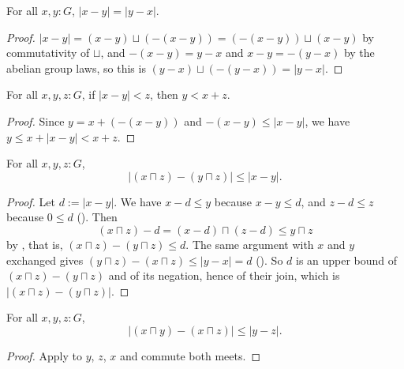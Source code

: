 \begin{lemma}
  \label{absSubComm}
  For all $x, y : G$, $\lvert x - y \rvert = \lvert y - x \rvert$.
\end{lemma}
\begin{proof}
  $\lvert x - y \rvert = (x - y) \sqcup (-(x - y)) = (-(x - y)) \sqcup (x - y)$ by commutativity of $\sqcup$, and $-(x - y) = y - x$ and $x - y = -(y - x)$ by the abelian group laws, so this is $(y - x) \sqcup (-(y - x)) = \lvert y - x \rvert$.
\end{proof}

\begin{lemma}
  \label{absDeltaLtLtPlus}
  For all $x, y, z : G$, if $\lvert x - y \rvert < z$, then $y < x + z$.
\end{lemma}
\begin{proof}
  Since $y = x + (-(x - y))$ and $-(x - y) \le \lvert x - y \rvert$, we have $y \le x + \lvert x - y \rvert < x + z$.
\end{proof}

\begin{lemma}
  \label{absDeltaMeetR}
  For all $x, y, z : G$,
  \[
    \lvert (x \sqcap z) - (y \sqcap z) \rvert \le \lvert x - y \rvert.
  \]
\end{lemma}
\begin{proof}
  Let $d := \lvert x - y \rvert$. We have $x - d \le y$ because $x - y \le d$, and $z - d \le z$ because $0 \le d$ (). Then
  \[
    (x \sqcap z) - d = (x - d) \sqcap (z - d) \le y \sqcap z
  \]
  by , that is, $(x \sqcap z) - (y \sqcap z) \le d$. The same argument with $x$ and $y$ exchanged gives $(y \sqcap z) - (x \sqcap z) \le \lvert y - x \rvert = d$ (). So $d$ is an upper bound of $(x \sqcap z) - (y \sqcap z)$ and of its negation, hence of their join, which is $\lvert (x \sqcap z) - (y \sqcap z) \rvert$.
\end{proof}

\begin{corollary}
  \label{absDeltaMeetL}
  For all $x, y, z : G$,
  \[
    \lvert (x \sqcap y) - (x \sqcap z) \rvert \le \lvert y - z \rvert.
  \]
\end{corollary}
\begin{proof}
  Apply  to $y$, $z$, $x$ and commute both meets.
\end{proof}

